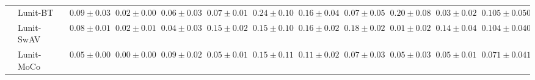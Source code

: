 \begin{tabular}{ll|cccc|c|cccc|c}
 & Lunit-BT~\cite{kang2023benchmarking} & $0.09 \pm 0.03$ & $0.02 \pm 0.00$ & $0.06 \pm 0.03$ & $0.07 \pm 0.01$ & $0.24 \pm 0.10$ & $0.16 \pm 0.04$ & $0.07 \pm 0.05$ & $0.20 \pm 0.08$ & $0.03 \pm 0.02$ & $0.105 \pm 0.050$ \\
 & Lunit-SwAV~\cite{kang2023benchmarking} & $0.08 \pm 0.01$ & $0.02 \pm 0.01$ & $0.04 \pm 0.03$ & $0.15 \pm 0.02$ & $0.15 \pm 0.10$ & $0.16 \pm 0.02$ & $0.18 \pm 0.02$ & $\mathbf{0.01 \pm 0.02}$ & $0.14 \pm 0.04$ & $0.104 \pm 0.040$ \\
 & Lunit-MoCo~\cite{kang2023benchmarking} & $0.05 \pm 0.00$ & $\mathbf{0.00 \pm 0.00}$ & $0.09 \pm 0.02$ & $0.05 \pm 0.01$ & $0.15 \pm 0.11$ & $0.11 \pm 0.02$ & $0.07 \pm 0.03$ & $0.05 \pm 0.03$ & $0.05 \pm 0.01$ & $0.071 \pm 0.041$ \\
\cline{1-12}
\bottomrule
\end{tabular}
